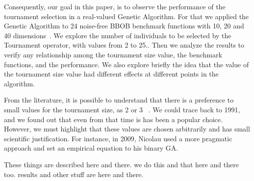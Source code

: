  Consequently, our goal in this paper, is to observe the performance of the tournament selection in a real-valued Genetic Algorithm. For that we applied the Genetic Algorithm to 24 noise-free BBOB benchmark functions with 10, 20 and 40 dimensions~\cite{hansen2010real}. We explore the number of individuals to be selected by the Tournament operator, with values from 2 to 25.. Then we analyze the results to verify any relationship among the tournament size value, the benchmark functions, and the performance. We also explore briefly the idea that the value of the tournament size value had different effects at different points in the algorithm.

 From the literature, it is possible to understand that there is a preference to small values for the tournament size, as 2 or 3 ~\cite{goldberg1991real, goldberg1993toward, agrawal1995simulated, harik1999gambler, tsutsui1999multi, harik1999compact, deb2000efficient, beyer2001self,kaelo2007integrated, bhunia2009application,  nicolau2009application, sawyerr2011comparative, sawyerr2015benchmarking}. We could trace back to 1991, and we found out that even from that time is has been a popular choice. However, we must highlight that these values are chosen arbitrarily and has small scientific justification. For instance, in 2009, Nicolau used a more pragmatic approach and set an empirical equation to his binary GA. 
 
 

These things are described here and there. we do this and that here and there too. results and other stuff are here and there.
